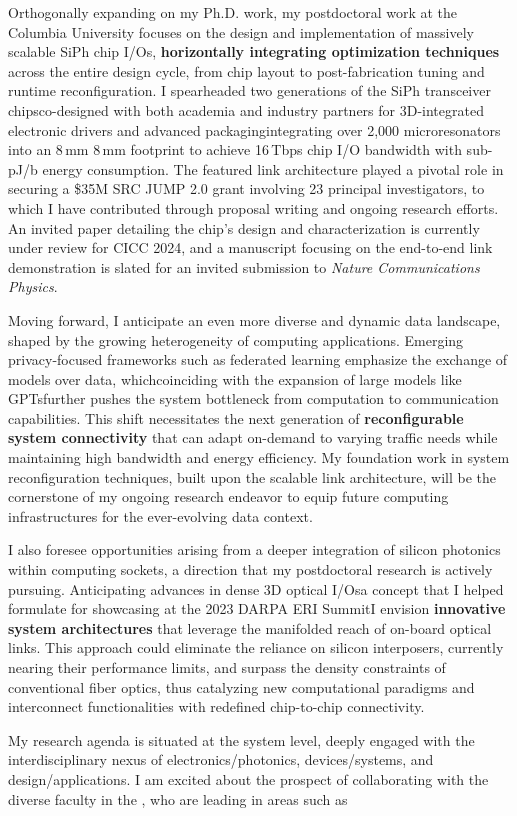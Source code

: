 Orthogonally expanding on my Ph.D. work, my postdoctoral work at the Columbia University focuses on the design and implementation of massively scalable SiPh chip I/Os, \textbf{horizontally integrating optimization techniques} across the entire design cycle, from chip layout to post-fabrication tuning and runtime reconfiguration. I spearheaded two generations of the SiPh transceiver chips\textemdash co-designed with both academia and industry partners for 3D-integrated electronic drivers and advanced packaging\textemdash integrating over 2,000 microresonators into an 8\,mm \texttimes{} 8\,mm footprint to achieve 16\,Tbps chip I/O bandwidth with sub-pJ/b energy consumption. The featured link architecture played a pivotal role in securing a \$35M SRC JUMP 2.0 grant involving 23 principal investigators, to which I have contributed through proposal writing and ongoing research efforts. An invited paper detailing the chip's design and characterization is currently under review for CICC 2024, and a manuscript focusing on the end-to-end link demonstration is slated for an invited submission to \emph{Nature Communications Physics}.

Moving forward, I anticipate an even more diverse and dynamic data landscape, shaped by the growing heterogeneity of computing applications. Emerging privacy-focused frameworks such as federated learning emphasize the exchange of models over data, which\textemdash coinciding with the expansion of large models like GPTs\textemdash further pushes the system bottleneck from computation to communication capabilities. This shift necessitates the next generation of \textbf{reconfigurable system connectivity} that can adapt on-demand to varying traffic needs while maintaining high bandwidth and energy efficiency. My foundation work in system reconfiguration techniques, built upon the scalable link architecture, will be the cornerstone of my ongoing research endeavor to equip future computing infrastructures for the ever-evolving data context.

I also foresee opportunities arising from a deeper integration of silicon photonics within computing sockets, a direction that my postdoctoral research is actively pursuing. Anticipating advances in dense 3D optical I/Os\textemdash a concept that I helped formulate for showcasing at the 2023 DARPA ERI Summit\textemdash I envision \textbf{innovative system architectures} that leverage the manifolded reach of on-board optical links. This approach could eliminate the reliance on silicon interposers, currently nearing their performance limits, and surpass the density constraints of conventional fiber optics, thus catalyzing new computational paradigms and interconnect functionalities with redefined chip-to-chip connectivity.

My research agenda is situated at the system level, deeply engaged with the interdisciplinary nexus of electronics/photonics, devices/systems, and design/applications. I am excited about the prospect of collaborating with the diverse faculty in the \appDept{}, who are leading in areas such as%